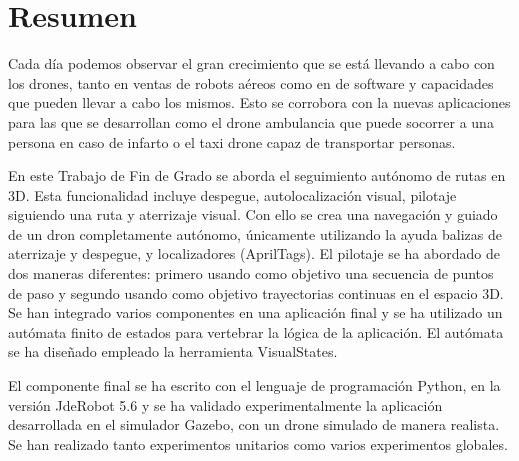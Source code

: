 \documentclass[a4paper, 12pt, oneside]{book}
\begin{document}
\chapter*{Resumen}
\hspace{1cm} Cada día podemos observar el gran crecimiento que se está llevando a cabo con los drones, tanto en ventas de robots aéreos como en de software y capacidades que pueden llevar a cabo los mismos. Esto se corrobora con la nuevas aplicaciones para las que se desarrollan como el drone ambulancia que puede socorrer a una persona en caso de infarto o el taxi drone capaz de transportar personas.

\hspace{1cm} En este Trabajo de Fin de Grado se aborda el seguimiento autónomo de rutas en 3D. Esta funcionalidad incluye despegue, autolocalización visual, pilotaje siguiendo una ruta y aterrizaje visual. Con ello se crea una navegación y guiado de un dron completamente autónomo, únicamente utilizando la ayuda balizas de aterrizaje y despegue, y localizadores (AprilTags). El pilotaje se ha abordado de dos maneras diferentes: primero usando como objetivo una secuencia de puntos de paso y segundo usando como objetivo trayectorias continuas en el espacio 3D. Se han integrado varios componentes en una aplicación final y se ha utilizado un autómata finito de estados para vertebrar la lógica de la aplicación. El autómata se ha diseñado empleado la herramienta VisualStates.

\hspace{1cm} El componente final se ha escrito con el lenguaje de programación Python, en la versión JdeRobot 5.6 y se ha validado experimentalmente la aplicación desarrollada en el simulador Gazebo, con un drone simulado de manera realista. Se han realizado tanto experimentos unitarios como varios experimentos globales.

\renewcommand{\tablename}{Tabla}
\tableofcontents %

\listoffigures %
\cleardoublepage

\pagestyle{fancy}
\setlength{\parindent}{6mm}

\lhead[]{}






\end{document}
